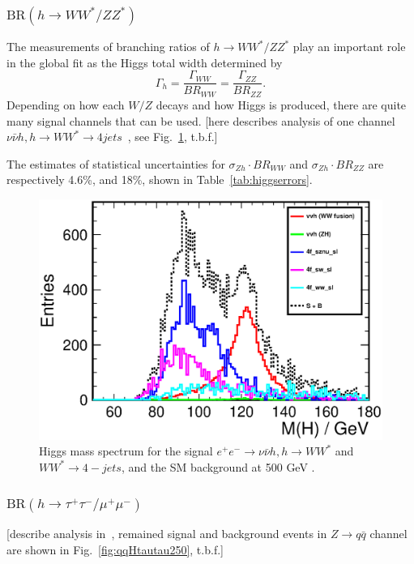 \subsubsection{$\mathrm{BR}(h\to WW^*/ZZ^*)$}
The measurements of branching ratios of $h\to WW^*/ZZ^*$ play an important role
in the global fit as the Higgs total width determined by
$$\Gamma_h=\frac{\Gamma_{WW}}{BR_{WW}}=\frac{\Gamma_{ZZ}}{BR_{ZZ}}.$$
Depending on how each $W/Z$ decays and how Higgs is produced, there
are quite many signal channels that can be used. [here describes analysis of one channel 
$\nu\bar{\nu}h, h\to WW^*\to 4 jets$~\cite{Durig:2014lfa}, see Fig.~\ref{fig:vvHWW500}, t.b.f.]

The estimates of statistical uncertainties for $\sigma_{Zh}\cdot BR_{WW}$ and
$\sigma_{Zh}\cdot BR_{ZZ}$ are respectively
4.6\%, and 18\%, shown in Table~\ref{tab:higgserrors}.

\begin{figure}
\begin{center}
\includegraphics[width=0.85\hsize]{chapters/figures/vvH_WW4j500_MassH.eps}
\end{center}
  \caption{Higgs mass spectrum for the signal $e^+e^-\to\nu\bar\nu h, h\to WW^{*}$
  and $WW^{*}\to 4-jets$, and the SM background 
  at 500 GeV \cite{Durig:2014lfa}.}
  \label{fig:vvHWW500}
\end{figure}

\subsubsection{$\mathrm{BR}(h\to \tau^+\tau^-/\mu^+\mu^-)$}
[describe analysis in~\cite{Kawada:2015wea}, remained signal and
 background events in $Z\to q\bar{q}$ channel are shown in 
 Fig.~\ref{fig:qqHtautau250}, t.b.f.]
 
